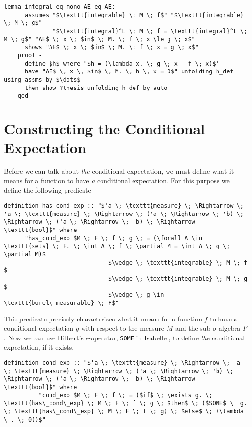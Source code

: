 \begin{isacorollary}
{\small
	\begin{lstlisting}[style=isabelle]
	lemma integral_eq_mono_AE_eq_AE:
	  assumes "$\texttt{integrable} \; M \; f$" "$\texttt{integrable} \; M \; g$" 
			  "$\texttt{integral}^L \; M \; f = \texttt{integral}^L \; M \; g$" "AE$ \; x \; $in$ \; M. \; f \; x \le g \; x$" 
	  shows "AE$ \; x \; $in$ \; M. \; f \; x = g \; x$"
	proof -
	  define $h$ where "$h = (\lambda x. \; g \; x - f \; x)$"
	  have "AE$ \; x \; $in$ \; M. \; h \; x = 0$" unfolding h_def using assms by $\dots$
	  then show ?thesis unfolding h_def by auto
	qed
	\end{lstlisting}
}
\end{isacorollary}

\section{Constructing the Conditional Expectation}

Before we can talk about \textit{the} conditional expectation, we must define what it means for a function to have \textit{a} conditional expectation. For this purpose we define the following predicate

\begin{isadefinition}
{\small
\begin{lstlisting}[style=isabelle]
	definition has_cond_exp :: "$'a \; \texttt{measure} \; \Rightarrow \; 'a \; \texttt{measure} \; \Rightarrow \; ('a \; \Rightarrow \; 'b) \; \Rightarrow \; ('a \; \Rightarrow \; 'b) \; \Rightarrow \texttt{bool}$" where 
	  "has_cond_exp $M \; F \; f \; g \; = (\forall A \in \texttt{sets} \; F. \; \int_A \; f \; \partial M = \int_A \; g \; \partial M)$
							  $\wedge \; \texttt{integrable} \; M \; f $
							  $\wedge \; \texttt{integrable} \; M \; g $
							  $\wedge \; g \in \texttt{borel\_measurable} \; F$"
\end{lstlisting}
}
\end{isadefinition}


This predicate precisely characterizes what it means for a function $f$ to have a conditional expectation $g$ with respect to the measure $M$ and the sub-$\sigma$-algebra $F$. Now we can use Hilbert's $\epsilon$-operator, \lstinline[language=isabelle]{SOME} in Isabelle \cite{Nipkow-Paulson-Wenzel:2002}, to define \textit{the} conditional expectation, if it exists.


\begin{isadefinition}
{\small
	\begin{lstlisting}[style=isabelle]
		definition cond_exp :: "$'a \; \texttt{measure} \; \Rightarrow \; 'a \; \texttt{measure} \; \Rightarrow \; ('a \; \Rightarrow \; 'b) \; \Rightarrow \; ('a \; \Rightarrow \; 'b) \; \Rightarrow \texttt{bool}$" where 
		  "cond_exp $M \; F \; f \; = ($if$ \; \exists g. \; \texttt{has\_cond\_exp} \; M \; F \; f \; g \; $then$ \; ($SOME$ \; g. \; \texttt{has\_cond\_exp} \; M \; F \; f \; g) \; $else$ \; (\lambda \_. \; 0))$"
	\end{lstlisting}
}
\end{isadefinition}

